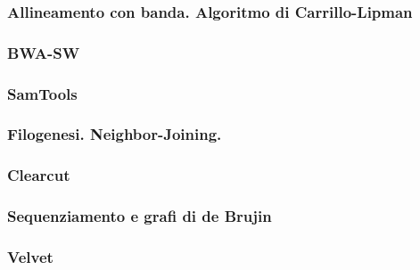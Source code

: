 \begin{frame}[fragile]
\frametitle{Allineamento con banda. Algoritmo di Carrillo-Lipman}
\end{frame}

\begin{frame}[fragile]
\frametitle{BWA-SW}
\end{frame}

\begin{frame}[fragile]
\frametitle{SamTools}
\end{frame}

\begin{frame}[fragile]
\frametitle{Filogenesi. Neighbor-Joining.}
\end{frame}

\begin{frame}[fragile]
\frametitle{Clearcut}
\end{frame}

\begin{frame}[fragile]
\frametitle{Sequenziamento e grafi di de Brujin}
\end{frame}

\begin{frame}[fragile]
\frametitle{Velvet}
\end{frame}

